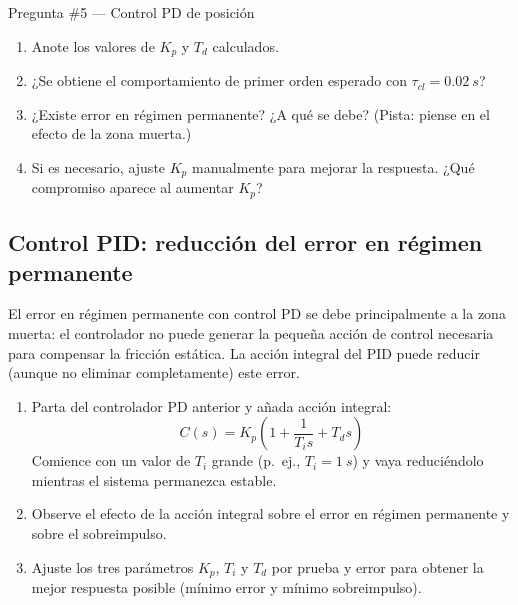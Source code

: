 \documentclass[12pt,a4paper]{article}
\begin{document}
\begin{pregunta}{Pregunta \#5 — Control PD de posición}
  \begin{enumerate}[label=\alph*)]
    \item Anote los valores de $K_p$ y $T_d$ calculados.
    \item ¿Se obtiene el comportamiento de primer orden esperado con $\tau_{cl}=\SI{0.02}{s}$?
    \item ¿Existe error en régimen permanente? ¿A qué se debe?
          (Pista: piense en el efecto de la zona muerta.)
    \item Si es necesario, ajuste $K_p$ manualmente para mejorar la respuesta.
          ¿Qué compromiso aparece al aumentar $K_p$?
  \end{enumerate}
\end{pregunta}

\subsection{Control PID: reducción del error en régimen permanente}

El error en régimen permanente con control PD se debe principalmente a la zona
muerta: el controlador no puede generar la pequeña acción de control necesaria
para compensar la fricción estática. La acción integral del PID puede reducir
(aunque no eliminar completamente) este error.

\begin{enumerate}
  \item Parta del controlador PD anterior y añada acción integral:
        \begin{equation}
          C(s) = K_p\left(1 + \frac{1}{T_i s} + T_d s\right)
        \end{equation}
        Comience con un valor de $T_i$ grande (p.~ej., $T_i = \SI{1}{s}$) y
        vaya reduciéndolo mientras el sistema permanezca estable.
  \item Observe el efecto de la acción integral sobre el error en régimen
        permanente y sobre el sobreimpulso.
  \item Ajuste los tres parámetros $K_p$, $T_i$ y $T_d$ por prueba y error para
        obtener la mejor respuesta posible (mínimo error y mínimo sobreimpulso).
\end{enumerate}
\end{document}
